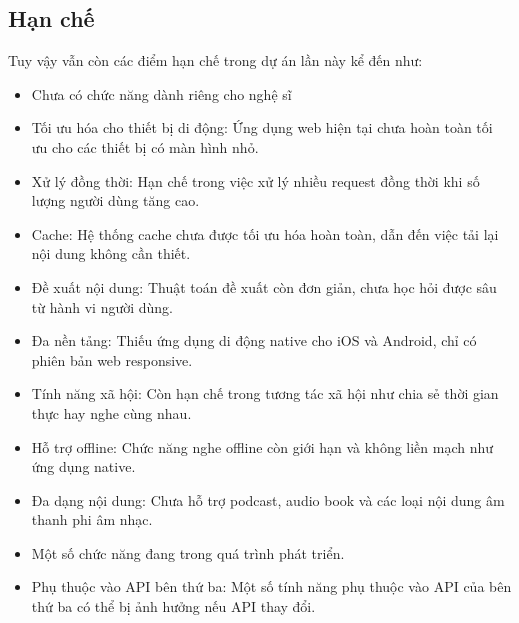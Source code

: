\documentclass[a4paper,12pt]{article}
\begin{document}
\subsection{Hạn chế}
Tuy vậy vẫn còn các điểm hạn chế trong dự án lần này kể đến như:
\begin{itemize}
    \item Chưa có chức năng dành riêng cho nghệ sĩ
    \item Tối ưu hóa cho thiết bị di động: Ứng dụng web hiện tại chưa hoàn toàn tối ưu cho các thiết bị có màn hình nhỏ. 
    \item Xử lý đồng thời: Hạn chế trong việc xử lý nhiều request đồng thời khi số lượng người dùng tăng cao.
    \item Cache: Hệ thống cache chưa được tối ưu hóa hoàn toàn, dẫn đến việc tải lại nội dung không cần thiết.
    \item Đề xuất nội dung: Thuật toán đề xuất còn đơn giản, chưa học hỏi được sâu từ hành vi người dùng.
    \item Đa nền tảng: Thiếu ứng dụng di động native cho iOS và Android, chỉ có phiên bản web responsive.
    \item Tính năng xã hội: Còn hạn chế trong tương tác xã hội như chia sẻ thời gian thực hay nghe cùng nhau.
    \item Hỗ trợ offline: Chức năng nghe offline còn giới hạn và không liền mạch như ứng dụng native.
    \item Đa dạng nội dung: Chưa hỗ trợ podcast, audio book và các loại nội dung âm thanh phi âm nhạc.
    \item Một số chức năng đang trong quá trình phát triển.
    \item Phụ thuộc vào API bên thứ ba: Một số tính năng phụ thuộc vào API của bên thứ ba có thể bị ảnh hưởng nếu API thay đổi.
\end{itemize}
\end{document}
